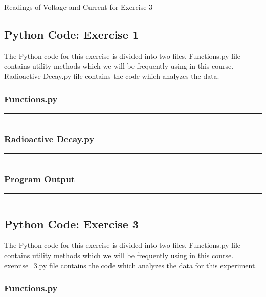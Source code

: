 \documentclass[letterpaper,12pt]{article}
\begin{document}
\begin{table}[H]
  \centering
  
  \caption{Readings of Voltage and Current for Exercise 3}
  \label{ex3data}
\end{table}

\pagebreak

\subsection{Python Code: Exercise 1}

The Python code for this exercise is divided into two files. Functions.py file contains utility methods
which we will be frequently using in this course. Radioactive Decay.py file contains the code which analyzes
the data.

\subsubsection{Functions.py}
\noindent\rule{\textwidth}{1pt}

\noindent\rule{\textwidth}{1pt}

\pagebreak

\subsubsection{Radioactive Decay.py}
\noindent\rule{\textwidth}{1pt}

\noindent\rule{\textwidth}{1pt}

\pagebreak
\subsubsection{Program Output}
\noindent\rule{\textwidth}{1pt}

\noindent\rule{\textwidth}{1pt}

\pagebreak

\subsection{Python Code: Exercise 3}

The Python code for this exercise is divided into two files. Functions.py file 
contains utility methods
which we will be frequently using in this course. exercise\_3.py file contains 
the code which analyzes
the data for this experiment.

\subsubsection{Functions.py}
\end{document}
